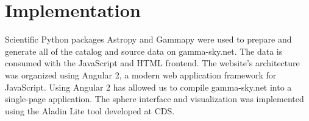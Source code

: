 \section{Implementation}

Scientific Python packages Astropy \cite{astropy} and Gammapy \cite{gammapy} were used to prepare and generate all of the catalog and source data on gamma-sky.net. The data is consumed with the JavaScript and HTML frontend. The website's architecture was organized using Angular 2, a modern web application framework for JavaScript. Using Angular 2 has allowed us to compile gamma-sky.net into a single-page application. The sphere interface and visualization was implemented using the Aladin Lite tool \cite{aladin-lite} developed at CDS.
